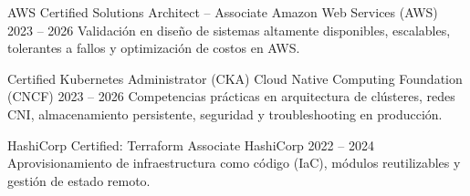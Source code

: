 %
%
%
%
%


\cvEducationItem
    {AWS Certified Solutions Architect -- Associate}
    {Amazon Web Services (AWS)}
    {2023 -- 2026}
    {Validación en diseño de sistemas altamente disponibles, escalables, tolerantes a fallos y optimización de costos en AWS.}

\cvEducationItem
    {Certified Kubernetes Administrator (CKA)}
    {Cloud Native Computing Foundation (CNCF)}
    {2023 -- 2026}
    {Competencias prácticas en arquitectura de clústeres, redes CNI, almacenamiento persistente, seguridad y troubleshooting en producción.}

\cvEducationItem
    {HashiCorp Certified: Terraform Associate}
    {HashiCorp}
    {2022 -- 2024}
    {Aprovisionamiento de infraestructura como código (IaC), módulos reutilizables y gestión de estado remoto.}

